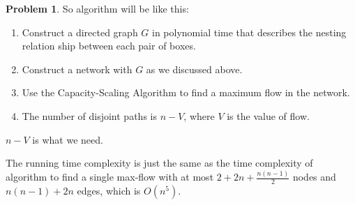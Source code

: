 \documentclass[a4paper]{article}
\theoremstyle{definition}
\newtheorem{problem}{Problem}
\theoremstyle{plain}
\numberwithin{equation}{problem}
\begin{document}
\begin{problem}
    So algorithm will be like this:

    \begin{enumerate}
        \item Construct a directed graph  $ G  $ in polynomial time that describes the nesting relation ship between each pair of boxes.
        \item Construct a network with  $ G  $ as we discussed above.
        \item Use the Capacity-Scaling Algorithm to find a maximum flow in the network.
        \item The number of disjoint paths is  $ n-V $, where  $ V $ is the value of flow.
    \end{enumerate}
     $ n-V $ is what we need.

    The running time complexity is just the same as the time complexity of algorithm to find a single max-flow with at most $ 2+2n+\frac{n(n-1)}{2} $ nodes and  $ n(n-1)+2n $ edges, which is  $ O(n^5) $. 

\end{problem}
\end{document}
